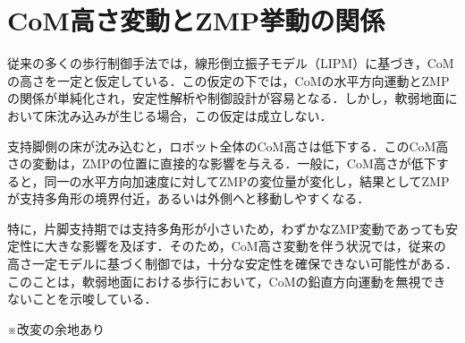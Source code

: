 \section{CoM高さ変動とZMP挙動の関係}

従来の多くの歩行制御手法では，線形倒立振子モデル（LIPM）に基づき，CoMの高さを一定と仮定している．この仮定の下では，CoMの水平方向運動とZMPの関係が単純化され，安定性解析や制御設計が容易となる．しかし，軟弱地面において床沈み込みが生じる場合，この仮定は成立しない．

支持脚側の床が沈み込むと，ロボット全体のCoM高さは低下する．このCoM高さの変動は，ZMPの位置に直接的な影響を与える．一般に，CoM高さが低下すると，同一の水平方向加速度に対してZMPの変位量が変化し，結果としてZMPが支持多角形の境界付近，あるいは外側へと移動しやすくなる．

特に，片脚支持期では支持多角形が小さいため，わずかなZMP変動であっても安定性に大きな影響を及ぼす．そのため，CoM高さ変動を伴う状況では，従来の高さ一定モデルに基づく制御では，十分な安定性を確保できない可能性がある．このことは，軟弱地面における歩行において，CoMの鉛直方向運動を無視できないことを示唆している．

\( ※ 改変の余地あり \)